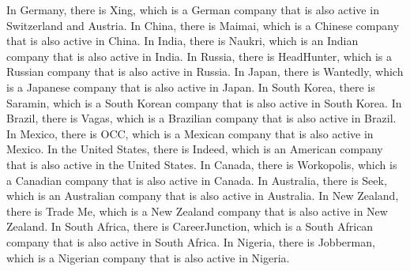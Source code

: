 In Germany, there is Xing, which is a German company that is also active in Switzerland and Austria.
In China, there is Maimai, which is
a Chinese company that is also active in China. In India, there is Naukri, which is an Indian company that is also
active in India. In Russia, there is HeadHunter, which is a Russian company that is also active in Russia. In Japan,
there is Wantedly, which is a Japanese company that is also active in Japan. In South Korea, there is Saramin, which
is a South Korean company that is also active in South Korea. In Brazil, there is Vagas, which is a Brazilian company
that is also active in Brazil. In Mexico, there is OCC, which is a Mexican company that is also active in Mexico.
In the United States, there is Indeed, which is an American company that is also active in the United States. In
Canada, there is Workopolis, which is a Canadian company that is also active in Canada. In Australia, there is
Seek, which is an Australian company that is also active in Australia. In New Zealand, there is Trade Me, which is
a New Zealand company that is also active in New Zealand. In South Africa, there is CareerJunction, which is a
South African company that is also active in South Africa. In Nigeria, there is Jobberman, which is a Nigerian
company that is also active in Nigeria.